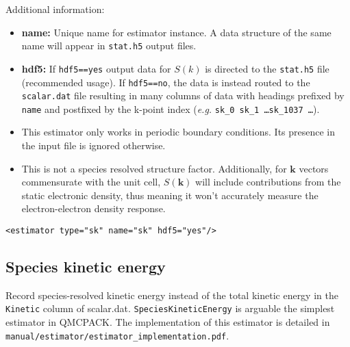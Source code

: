 Additional information:
\begin{itemize}
  \item{\textbf{name:} Unique name for estimator instance.  A data structure of the same name will appear in \texttt{stat.h5} output files.}
  \item{\textbf{hdf5:} If \texttt{hdf5==yes} output data for $S(k)$ is directed to the \texttt{stat.h5} file (recommended usage).  If \texttt{hdf5==no}, the data is instead routed to the \texttt{scalar.dat} file resulting in many columns of data with headings prefixed by \texttt{name} and postfixed by the k-point index (\textit{e.g.} \texttt{sk\_0 sk\_1 \ldots sk\_1037 \ldots}).}
  \item{This estimator only works in periodic boundary conditions.  Its presence in the input file is ignored otherwise.}
  \item{This is not a species resolved structure factor.  Additionally, for $\mathbf{k}$ vectors commensurate with the unit cell, $S(\mathbf{k})$ will include contributions from the static electronic density, thus meaning it won't accurately measure the electron-electron density response.  }
\end{itemize}

\begin{lstlisting}[caption=Static structure factor estimator element.]
  <estimator type="sk" name="sk" hdf5="yes"/>
\end{lstlisting}



\subsection{Species kinetic energy}
Record species-resolved kinetic energy instead of the total kinetic energy in the \verb|Kinetic| column of scalar.dat. \verb|SpeciesKineticEnergy| is arguable the simplest estimator in QMCPACK. The implementation of this estimator is detailed in \verb|manual/estimator/estimator_implementation.pdf|.

